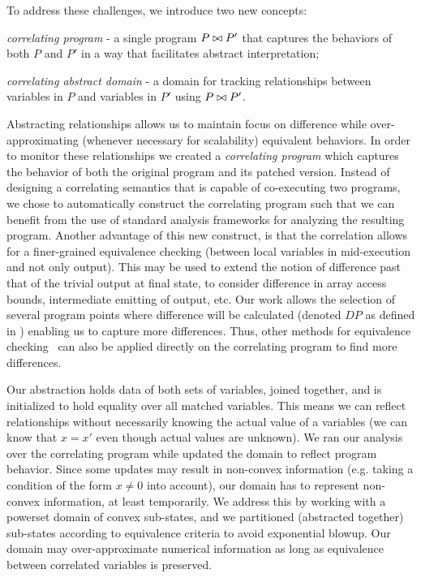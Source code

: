 To address these challenges, we introduce two new concepts:
\begin{inparaenum}[(i)]
\item \emph{correlating program} - a single program $P \bowtie P'$ that captures the behaviors of both $P$ and $P'$ in a way that facilitates abstract interpretation;
\item \emph{correlating abstract domain} - a domain for tracking relationships between variables in $P$ and variables in $P'$ using $P \bowtie P'$.
\end{inparaenum}

Abstracting relationships allows us to maintain focus on difference while
over-approximating (whenever necessary for scalability) equivalent behaviors. In order to monitor these relationships we created a
\emph{correlating program} which captures the behavior of both the original
program and its patched version. Instead of designing a correlating semantics
that is capable of co-executing two programs, we chose to automatically
construct the correlating program such that we can benefit from the use of
standard analysis frameworks for analyzing the resulting program. Another
advantage of this new construct, is that the correlation
allows for a finer-grained equivalence checking (between local
variables in mid-execution and not only output). This may be used to extend the notion of difference past that of the trivial output at final state, to consider difference in array access bounds, intermediate emitting of output, etc. Our work allows the selection of several program points where difference will be calculated (denoted $DP$ as defined in ) enabling us to capture more differences. Thus, other methods for equivalence checking~\cite{EnglerRamos11,GodlinStrichman09,DwyerElbaumPerson08} can also be applied directly on the correlating program to find more differences.

Our abstraction holds data of both sets of variables, joined together, and is
initialized to hold equality over all matched variables. This means we can
reflect relationships without necessarily knowing the actual value of a
variables (we can know that $x = x'$ even though actual values are
unknown). We ran our analysis over the correlating program while updated the
domain to reflect program behavior. Since some updates may result in non-convex information (e.g. taking  a condition of the form $x \neq 0$ into account), our domain has to represent non-convex information, at least temporarily. We address this by working with a powerset domain of convex sub-states, and we partitioned (abstracted together) sub-states according to equivalence criteria to avoid exponential blowup. Our domain may over-approximate numerical information as long as equivalence between correlated variables is preserved.

